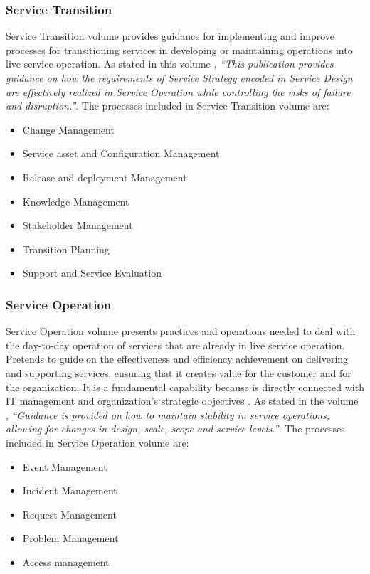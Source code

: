\subsubsection{Service Transition} 

Service Transition volume provides guidance for implementing and improve processes for transitioning services in developing or maintaining operations into live service operation. As stated in this volume \cite{itilST}, \textit{``This publication provides guidance on how the requirements of Service Strategy encoded in Service Design are effectively realized in Service Operation while controlling the risks of failure and disruption.''}. The processes included in Service Transition volume are:

\begin{itemize}
  \item Change Management
  \item Service asset and Configuration Management
  \item Release and deployment Management
  \item Knowledge Management
  \item Stakeholder Management
  \item Transition Planning 
  \item Support and Service Evaluation 
\end{itemize} 

\subsubsection{Service Operation} 

Service Operation volume presents practices and operations needed to deal with the day-to-day operation of services that are already in live service operation. Pretends to guide on the effectiveness and efficiency achievement on delivering and supporting services, ensuring that it creates value for the customer and for the organization. It is a fundamental capability because is directly connected with IT management and organization's strategic objectives . As stated in the volume \cite{itilSO}, \textit{``Guidance is provided on how to maintain stability in service operations, allowing for changes in design, scale, scope and service levels.''}. The processes included in Service Operation volume are:

\begin{itemize}
  \item Event Management
  \item Incident Management
  \item Request Management
  \item Problem Management
  \item Access management
\end{itemize} 

